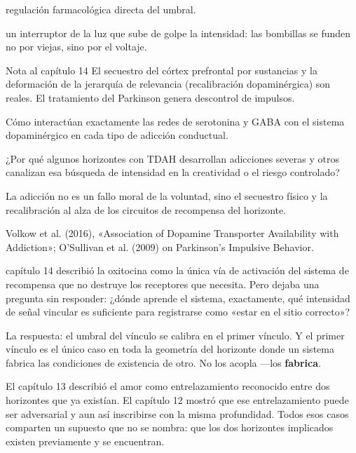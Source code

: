 \begin{fisica}
 regulación farmacológica directa del umbral.

 un interruptor de la luz que sube de golpe la intensidad: las bombillas se funden no por viejas, sino por el voltaje.
\end{fisica}
\begin{notacap}{Nota al capítulo 14}
 El secuestro del córtex prefrontal por sustancias y la deformación de la jerarquía de relevancia (recalibración dopaminérgica) son reales. El tratamiento del Parkinson genera descontrol de impulsos.

 Cómo interactúan exactamente las redes de serotonina y GABA con el sistema dopaminérgico en cada tipo de adicción conductual.

 ¿Por qué algunos horizontes con TDAH desarrollan adicciones severas y otros canalizan esa búsqueda de intensidad en la creatividad o el riesgo controlado?

 La adicción no es un fallo moral de la voluntad, sino el secuestro físico y la recalibración al alza de los circuitos de recompensa del horizonte.

 Volkow et al. (2016), «Association of Dopamine Transporter Availability with Addiction»; O’Sullivan et al. (2009) on Parkinson’s Impulsive Behavior.
\end{notacap}
\noindent {} capítulo 14 describió la oxitocina como la única vía de activación del sistema de recompensa que no destruye los receptores que necesita. Pero dejaba una pregunta sin responder: ¿dónde aprende el sistema, exactamente, qué intensidad de señal vincular es suficiente para registrarse como «estar en el sitio correcto»?

La respuesta: el umbral del vínculo se calibra en el primer vínculo. Y el primer vínculo es el único caso en toda la geometría del horizonte donde un sistema fabrica las condiciones de existencia de otro. No los acopla —los \textbf{fabrica}.

\noindent El capítulo 13 describió el amor como entrelazamiento reconocido entre dos horizontes que ya existían. El capítulo 12 mostró que ese entrelazamiento puede ser adversarial y aun así inscribirse con la misma profundidad. Todos esos casos comparten un supuesto que no se nombra: que los dos horizontes implicados existen previamente y se encuentran.

